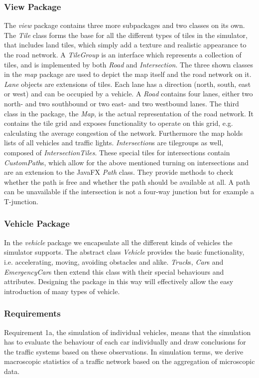 \subsubsection*{View Package}
The \textit{view} package contains three more subpackages and two classes on its own. The \textit{Tile} class forms the base for all the different types of tiles in the simulator, that includes land tiles, which simply add a texture and realistic appearance to the road network. A \textit{TileGroup} is an interface which represents a collection of tiles, and is implemented by both \textit{Road} and \textit{Intersection}.  The three shown classes in the \textit{map} package are used to depict the map itself and the road network on it. \textit{Lane} objects are extensions of tiles. Each lane has a direction (north, south, east or west) and can be occupied by a vehicle. A \textit{Road} contains four lanes, either two north- and two southbound or two east- and two westbound lanes. The third class in the package, the \textit{Map}, is the actual representation of the road network. It contains the tile grid and exposes functionality to operate on this grid, e.g. calculating the average congestion of the network. Furthermore the map holds lists of all vehicles and traffic lights. \textit{Intersection}s are tilegroups as well, composed of \textit{IntersectionTiles}. These special tiles for intersections contain \textit{CustomPath}s, which allow for the above mentioned turning on intersections and are an extension to the JavaFX \textit{Path} class. They provide methods to check whether the path is free and whether the path should be available at all. A path can be unavailable if the intersection is not a four-way junction but for example a T-junction.  
\subsubsection*{Vehicle Package}
In the \textit{vehicle} package we encapsulate all the different kinds of vehicles the simulator supports. The abstract class \textit{Vehicle} provides the basic functionality, i.e. accelerating, moving, avoiding obstacles and alike. \textit{Truck}s, \textit{Car}s and \textit{EmergencyCar}s then extend this class with their special behaviours and attributes. Designing the package in this way will effectively allow the easy introduction of many types of vehicle.

\subsubsection{Requirements}
Requirement 1a, the simulation of individual vehicles, means that the simulation has to evaluate the behaviour of each car individually and draw conclusions for the traffic systems based on these observations. In simulation terms, we derive macroscopic statistics of a traffic network based on the aggregation of microscopic data.

